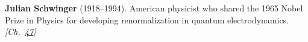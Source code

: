 \nobelphysics \textbf{Julian Schwinger} (1918–1994). American physicist who shared the 1965 Nobel Prize in Physics for developing renormalization in quantum electrodynamics. \emph{[Ch.~\hyperref[ch:observervac]{47}]}

